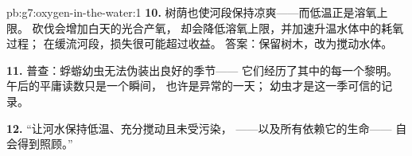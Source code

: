 \begin{solution}{pb:g7:oxygen-in-the-water:1}
\textbf{10.} 树荫也使河段保持凉爽——而低温正是溶氧上限。
砍伐会增加白天的光合产氧，
却会降低溶氧上限，并加速升温水体中的耗氧过程；
在缓流河段，损失很可能超过收益。
答案：保留树木，改为搅动水体。

\textbf{11.} 普查：蜉蝣幼虫无法伪装出良好的季节——
它们经历了其中的每一个黎明。午后的平庸读数只是一个瞬间，
也许是异常的一天；
幼虫才是这一季可信的记录。

\textbf{12.} “让河水保持低温、充分搅动且未受污染，
——以及所有依赖它的生命——
自会得到照顾。”
\end{solution}
